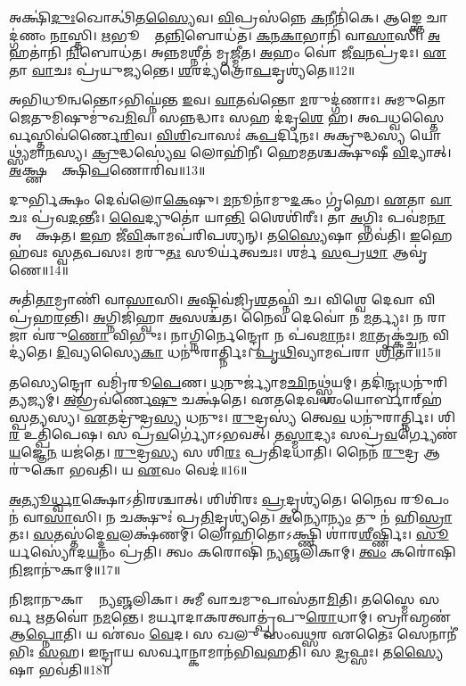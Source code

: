 𑌅𑌕𑍍𑌷𑌿॑\ul{𑌦𑍁𑌃}𑌖𑍋𑌤𑍍𑌥𑌿॑𑌤\ul{𑌸𑍍𑌯𑍈}𑌵। \ul{𑌵𑌿}𑌪𑍍𑌰𑌸॑𑌨𑍍𑌨𑍇 \ul{𑌕}𑌨𑍀𑌨𑌿॑𑌕𑍇। 
𑌆𑌙𑍍𑌕𑍍𑌤𑍇 𑌚𑌾𑌦𑍍𑌗॑𑌣𑌂 \ul{𑌨𑌾}𑌸𑍍𑌤𑌿। \ul{𑌋}𑌭𑍂𑌣𑌾𑌂᳚ 𑌤\ul{𑌨𑍍𑌨𑌿}𑌬𑍋𑌧॑𑌤। 
\ul{𑌕}\ul{𑌨}\ul{𑌕𑌾}𑌭𑌾𑌨𑌿॑ 𑌵𑌾\ul{𑌸𑌾}\ul{}𑌸𑌿। \ul{𑌅}𑌹𑌤𑌾॑𑌨𑌿 \ul{𑌨𑌿}𑌬𑍋𑌧॑𑌤। 
𑌅𑌨𑍍𑌨𑌮𑌶𑍍𑌨𑍀𑌤॑ 𑌮𑍃\ul{𑌜𑍍𑌮𑍀}𑌤। \ul{𑌅}𑌹𑌂 𑌵𑍋॑ 𑌜𑍀\ul{𑌵}𑌨𑌪𑍍𑌰॑𑌦𑌃। 
\ul{𑌏}𑌤𑌾 \ul{𑌵𑌾}𑌚𑌃 𑌪𑍍𑌰॑𑌯𑍁\ul{𑌜𑍍𑌯}𑌨𑍍𑌤𑍇। \ul{𑌶}𑌰𑌦𑍍𑌯॑𑌤𑍍𑌰𑍋\ul{𑌪}𑌦𑍃𑌶𑍍𑌯॑𑌤𑍇॥12॥

𑌅𑌭𑌿𑌧𑍂𑌨𑍍𑌵𑌨𑍍𑌤𑍋𑌽𑌭𑌿𑌘𑍍𑌨॑𑌨𑍍𑌤 \ul{𑌇}𑌵। \ul{𑌵𑌾}𑌤𑌵॑𑌨𑍍𑌤𑍋 \ul{𑌮}𑌰𑍁𑌦𑍍𑌗॑𑌣𑌾𑌃। 
𑌅𑌮𑍁𑌤𑍋 𑌜𑍇𑌤𑍁𑌮𑌿𑌷𑍁𑌮𑍁॑𑌖\ul{𑌮𑌿}𑌵। 𑌸𑌨𑍍𑌨𑌦𑍍𑌧𑌾𑌃 𑌸𑌹 𑌦॑𑌦𑍃\ul{𑌶𑍇} 𑌹। 
𑌅𑌪𑌧𑍍𑌵𑌸𑍍𑌤𑍈𑌰𑍍𑌵𑌸𑍍𑌤𑌿𑌵॑𑌰𑍍𑌣𑍈\ul{𑌰𑌿}𑌵। \ul{𑌵𑌿}\ul{𑌶𑌿}𑌖𑌾𑌸𑌃॑ 𑌕\ul{𑌪}𑌰𑍍𑌦𑌿𑌨𑌃। 
𑌅𑌕𑍍𑌰𑍁𑌦𑍍𑌧𑌸𑍍𑌯 𑌯𑍋𑌥𑍍𑌸𑍍𑌯॑𑌮𑌾\ul{𑌨}𑌸𑍍𑌯। \ul{𑌕𑍍𑌰𑍁}𑌦𑍍𑌧𑌸𑍍𑌯𑍇॑\ul{𑌵} 𑌲𑍋𑌹𑌿॑𑌨𑍀। 
𑌹𑍇𑌮𑌤𑌶𑍍𑌚𑌕𑍍𑌷𑍁॑𑌷𑍀 \ul{𑌵𑌿}𑌦𑍍𑌯𑌾𑌤𑍍‌। \ul{𑌅}𑌕𑍍𑌷𑍍𑌣𑌯𑍋𑌃᳚ 𑌕𑍍𑌷𑌿\ul{𑌪}𑌣𑍋𑌰𑌿॑𑌵॥13॥

𑌦𑍁𑌰𑍍𑌭𑌿𑌕𑍍𑌷𑌂 𑌦𑍇𑌵॑𑌲𑍋\ul{𑌕𑍇}𑌷𑍁। \ul{𑌮}𑌨𑍂𑌨𑌾॑𑌮𑍁\ul{𑌦}𑌕𑌂 𑌗𑍃॑𑌹𑍇। 
\ul{𑌏}𑌤𑌾 \ul{𑌵𑌾}𑌚𑌃 𑌪𑍍𑌰॑𑌵\ul{𑌦}𑌨𑍍𑌤𑍀𑌃। \ul{𑌵𑍈}𑌦𑍍𑌯𑍁𑌤𑍋॑ 𑌯𑌾\ul{𑌨𑍍𑌤𑌿} 𑌶𑍈𑌶𑌿॑𑌰𑍀𑌃। 
𑌤𑌾 \ul{𑌅}𑌗𑍍𑌨𑌿𑌃 𑌪𑌵॑𑌮\ul{𑌨𑌾} 𑌅𑌨𑍍𑌵𑍈᳚𑌕𑍍𑌷𑌤। \ul{𑌇}𑌹 𑌜𑍀॑\ul{𑌵𑌿}𑌕𑌾𑌮𑌪॑𑌰𑌿𑌪𑌶𑍍𑌯𑌨𑍍‌। 
𑌤\ul{𑌸𑍍𑌯𑍈}𑌷𑌾 𑌭𑌵॑𑌤𑌿। \ul{𑌇}𑌹𑍇𑌹॑𑌵𑌃 𑌸𑍍𑌵\ul{𑌤}𑌪𑌸𑌃। 
𑌮𑌰𑍁॑\ul{𑌤𑌃} 𑌸𑍂𑌰𑍍𑌯॑𑌤𑍍𑌵𑌚𑌃। 𑌶𑌰𑍍𑌮॑ \ul{𑌸}𑌪𑍍𑌰\ul{𑌥𑌾} 𑌆𑌵𑍃॑𑌣𑍇॥14॥\anuvakamend


𑌅𑌤𑌿॑\ul{𑌤𑌾}𑌮𑍍𑌰𑌾𑌣𑌿॑ 𑌵𑌾\ul{𑌸𑌾}\ul{}𑌸𑌿। \ul{𑌅}𑌷𑍍𑌟𑌿𑌵॑𑌜𑍍𑌰𑌿\ul{𑌶}𑌤𑌘𑍍𑌨𑌿॑ 𑌚। 
𑌵𑌿𑌶𑍍𑌵𑍇 𑌦𑍇𑌵𑌾 𑌵𑌿𑌪𑍍𑌰॑𑌹\ul{𑌰}𑌨𑍍𑌤𑌿। \ul{𑌅}𑌗𑍍𑌨𑌿𑌜𑌿॑𑌹𑍍𑌵𑌾 \ul{𑌅}𑌸𑌶𑍍𑌚॑𑌤। 
𑌨𑍈𑌵 𑌦𑍇𑌵𑍋॑ 𑌨 \ul{𑌮}𑌰𑍍𑌤𑍍𑌯𑌃। 𑌨 𑌰𑌾𑌜𑌾 𑌵॑𑌰𑍁\ul{𑌣𑍋} 𑌵𑌿𑌭𑍁𑌃। 
𑌨𑌾𑌗𑍍𑌨𑌿𑌰𑍍𑌨𑍇𑌨𑍍𑌦𑍍𑌰𑍋 𑌨 𑌪॑𑌵\ul{𑌮𑌾}𑌨𑌃। \ul{𑌮𑌾}𑌤𑍃𑌕𑍍𑌕॑𑌚𑍍𑌚\ul{𑌨} 𑌵𑌿𑌦𑍍𑌯॑𑌤𑍇। 
\ul{𑌦𑌿}𑌵𑍍𑌯𑌸𑍍𑌯𑍈\ul{𑌕𑌾} 𑌧𑌨𑍁॑𑌰𑌾𑌰𑍍𑌤𑍍𑌨𑌿𑌃। \ul{𑌪𑍃}\ul{𑌥𑌿}𑌵𑍍𑌯𑌾𑌮𑌪॑𑌰𑌾 \ul{𑌶𑍍𑌰𑌿}𑌤𑌾॥15॥

𑌤𑌸𑍍𑌯𑍇𑌨𑍍𑌦𑍍𑌰𑍋 𑌵𑌮𑍍𑌰𑌿॑𑌰𑍂\ul{𑌪𑍇}𑌣। \ul{𑌧}𑌨𑍁𑌰𑍍𑌜𑍍𑌯𑌾॑𑌮\ul{𑌛𑌿}𑌨𑌥𑍍𑌸𑍍𑌵॑𑌯𑌮𑍍। 
𑌤𑌦𑌿॑\ul{𑌨𑍍𑌦𑍍𑌰}𑌧𑌨𑍁॑\-𑌰𑌿\ul{𑌤𑍍𑌯}𑌜𑍍𑌯𑌮𑍍। \ul{𑌅}𑌭𑍍𑌰𑌵॑𑌰𑍍𑌣𑍇\ul{𑌷𑍁} 𑌚𑌕𑍍𑌷॑𑌤𑍇। 
𑌏𑌤𑌦𑍇𑌵 𑌶𑌂𑌯𑍋𑌰𑍍𑌬𑌾𑌰𑍍‌𑌹॑𑌸𑍍𑌪\ul{𑌤𑍍𑌯}𑌸𑍍𑌯। \ul{𑌏}𑌤𑌦𑍍𑌰𑍁॑𑌦𑍍𑌰\ul{𑌸𑍍𑌯} 𑌧𑌨𑍁𑌃। 
\ul{𑌰𑍁}𑌦𑍍𑌰𑌸𑍍𑌯॑ 𑌤𑍍𑌵𑍇\ul{𑌵} 𑌧𑌨𑍁॑𑌰𑌾𑌰𑍍𑌤𑍍𑌨𑌿𑌃। 𑌶𑌿\ul{𑌰} 𑌉𑌤𑍍𑌪𑌿॑𑌪𑍇𑌷। 
𑌸 𑌪𑍍𑌰॑\ul{𑌵}𑌰𑍍𑌗𑍍𑌯𑍋॑𑌽𑌭𑌵𑌤𑍍‌। 𑌤\ul{𑌸𑍍𑌮𑌾}𑌦𑍍𑌯𑌃 𑌸𑌪𑍍𑌰॑\ul{𑌵}𑌰𑍍𑌗𑍍𑌯𑍇𑌣॑ \ul{𑌯}𑌜𑍍𑌞𑍇\ul{𑌨} 𑌯𑌜॑𑌤𑍇। 
\ul{𑌰𑍁}𑌦𑍍𑌰\ul{𑌸𑍍𑌯} 𑌸 𑌶𑌿\ul{𑌰𑌃} 𑌪𑍍𑌰𑌤𑌿॑𑌦𑌧𑌾𑌤𑌿। 𑌨𑍈𑌨॑ \ul{𑌰𑍁}𑌦𑍍𑌰 𑌆𑌰𑍁॑𑌕𑍋 𑌭𑌵𑌤𑌿। 𑌯 \ul{𑌏}𑌵𑌂 𑌵𑍇𑌦॑॥16॥\anuvakamend


\ul{𑌅}\ul{𑌤𑍍𑌯𑍂}\ul{𑌰𑍍𑌧𑍍𑌵𑌾}𑌕𑍍𑌷𑍋𑌽𑌤𑌿॑𑌰𑌶𑍍𑌚𑌾𑌤𑍍‌। 𑌶𑌿𑌶𑌿॑𑌰𑌃 \ul{𑌪𑍍𑌰}𑌦𑍃𑌶𑍍𑌯॑𑌤𑍇। 
𑌨𑍈𑌵 𑌰𑍂𑌪𑌂 𑌨॑ 𑌵𑌾\ul{𑌸𑌾}\ul{}𑌸𑌿। 𑌨 𑌚𑌕𑍍𑌷𑍁𑌃॑ 𑌪𑍍𑌰\ul{𑌤𑌿}𑌦𑍃𑌶𑍍𑌯॑𑌤𑍇। 
\ul{𑌅}𑌨𑍍𑌯𑍋\ul{𑌨𑍍𑌯𑌂} 𑌤𑍁 𑌨॑ 𑌹𑌿\ul{𑌸𑍍𑌰𑌾}𑌤𑌃। \ul{𑌸}𑌤𑌸𑍍𑌤॑𑌦𑍍𑌦𑍇\ul{𑌵}𑌲𑌕𑍍𑌷॑𑌣𑌮𑍍‌। 
𑌲𑍋𑌹𑌿𑌤𑍋𑌽𑌕𑍍𑌷𑍍𑌣𑌿 𑌶𑌾॑𑌰\ul{𑌶𑍀}𑌰𑍍𑌷𑍍𑌣𑌿𑌃। \ul{𑌸𑍂}𑌰𑍍𑌯𑌸𑍍𑌯𑍋॑𑌦\ul{𑌯}𑌨𑌂 𑌪𑍍𑌰॑𑌤𑌿। 
𑌤𑍍𑌵𑌂 𑌕𑌰𑍋𑌷𑌿॑ 𑌨𑍍𑌯\ul{𑌞𑍍𑌜}𑌲𑌿𑌕𑌾𑌮𑍍‌। \ul{𑌤𑍍𑌵𑌂} 𑌕𑌰𑍋॑𑌷𑌿 \ul{𑌨𑌿}𑌜𑌾𑌨𑍁॑𑌕𑌾𑌮𑍍‌॥17॥

𑌨𑌿𑌜𑌾𑌨𑍁𑌕𑌾 𑌮𑍇᳚ 𑌨𑍍𑌯\ul{𑌞𑍍𑌜}𑌲𑌿𑌕𑌾। 𑌅𑌮𑍀 𑌵𑌾𑌚𑌮𑍁𑌪𑌾𑌸॑𑌤𑌾\ul{𑌮𑌿}𑌤𑌿। 
𑌤𑌸𑍍𑌮𑍈 𑌸𑌰𑍍𑌵 𑌋𑌤𑌵𑍋॑ 𑌨\ul{𑌮}𑌨𑍍𑌤𑍇। 𑌮𑌰𑍍𑌯𑌾𑌦𑌾𑌕𑌰𑌤𑍍𑌵𑌾𑌤𑍍𑌪𑍍𑌰॑\-𑌪𑍁\ul{𑌰𑍋}𑌧𑌾𑌮𑍍। 
𑌬𑍍𑌰𑌾𑌹𑍍𑌮𑌣॑ 𑌆\ul{𑌪𑍍𑌨𑍋}𑌤𑌿। 𑌯 𑌏॑𑌵𑌂 \ul{𑌵𑍇}𑌦। 𑌸 𑌖𑌲𑍁 𑌸𑌂𑌵𑌥𑍍𑌸𑌰 𑌏𑌤𑍈𑌃 𑌸𑍇𑌨𑌾𑌨𑍀॑𑌭𑌿𑌃 \ul{𑌸}𑌹। 
𑌇𑌨𑍍𑌦𑍍𑌰𑌾𑌯 𑌸𑌰𑍍𑌵𑌾𑌨𑍍𑌕𑌾𑌮𑌾𑌨॑𑌭𑌿\ul{𑌵}𑌹𑌤𑌿। 𑌸 \ul{𑌦𑍍𑌰}𑌫𑍍𑌸𑌃। 𑌤\ul{𑌸𑍍𑌯𑍈}𑌷𑌾 𑌭𑌵॑𑌤𑌿॥18॥

